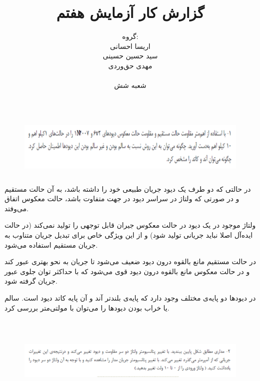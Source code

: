 \documentclass[12pt]{article}
\title{گزارش کار آزمایش هفتم}
\author{	گروه: \\	اریسا احسانی \\	سید حسین حسینی \\	مهدی حق‌وردی \\ \\	شعبه شش
}
\date{}
\begin{document}
	\maketitle
	\tableofcontents
	\newpage
	
\section{}
\begin{figure}[H]
\begin{center}
\includegraphics[width=\textwidth, height=3cm]{./images/7.1}
\end{center}
\end{figure}
	
در حالتی که دو طرف یک دیود جریان طبیعی خود را داشته باشد، به آن حالت مستقیم و در صورتی که ولتاژ در سراسر دیود در جهت متفاوت باشد، حالت معکوس اتفاق می‌وفتد.

ولتاژ موجود در یک دیود در حالت معکوس جیران قابل توجهی را تولید نمی‌کند (در حالت ایده‌آل اصلا نباید جریانی تولید شود) و از این ویژگی خاص برای تبدیل جریان متناوب به جریان مستقیم استفاده می‌شود.

در حالت مستقیم مانع بالقوه درون دیود ضعیف می‌شود تا جریان به نحو بهتری عبور کند و در حالت معکوس مانع بالقوه درون دیود قوی می‌شود که با حداکثر توان جلوی عبور جریان گرفته شود.

در دیود‌ها دو پایه‌ی مختلف وجود دارد که پایه‌ی بلند‌تر آند و آن پایه کاتد دیود است. سالم یا خراب بودن دیود‌ها را می‌توان با مولتی‌متر بررسی کرد.


\section{}
\begin{figure}[H]
	\begin{center}
		\includegraphics[width=\textwidth, height=3cm]{./images/7.2}
	\end{center}
\end{figure}
\end{document}
